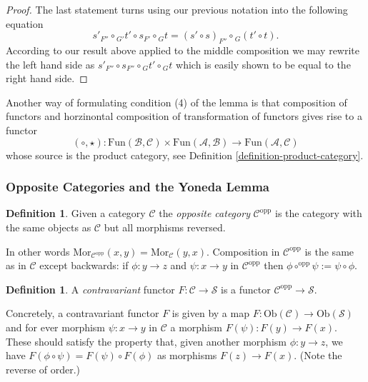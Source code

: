 \documentclass{amsart}
\theoremstyle{definition}
\newtheorem{definition}[theorem]{Definition}
\theoremstyle{remark}
\numberwithin{equation}{subsection}
\begin{document}
\begin{proof}
The last statement turns using our previous notation into the following
equation
$$
s'_{F''}
\circ
{}_{G'}t' 
\circ
s_{F'}
\circ
{}_Gt 
=
(s' \circ s)_{F''}
\circ
{}_G(t' \circ t).
$$
According to our result above applied to the middle composition
we may rewrite the left hand side as
$
s'_{F''}
\circ
s_{F''} 
\circ
{}_Gt'
\circ
{}_Gt 
$
which is easily shown to be equal to the right hand side.
\end{proof}

\noindent
Another way of formulating condition (4) of the lemma is
that composition of functors and horzinontal composition
of transformation of functors gives rise to a functor
$$
(\circ, \star) :
\text{Fun}(\mathcal{B}, \mathcal{C})
\times 
\text{Fun}(\mathcal{A}, \mathcal{B})
\longrightarrow
\text{Fun}(\mathcal{A}, \mathcal{C})
$$
whose source is the product category,
see Definition \ref{definition-product-category}.

\subsubsection{Opposite Categories and the Yoneda Lemma}
\label{subsubsection-opposite}

\begin{definition}
\label{definition-opposite}
Given a category $\mathcal{C}$ the {\it opposite category}
$\mathcal{C}^{\text{opp}}$ is the category with the same objects
as $\mathcal{C}$ but all morphisms reversed.
\end{definition}

\noindent
In other
words $\text{Mor}_{\mathcal{C}^{\text{opp}}}(x,y) =
\text{Mor}_{\mathcal{C}}(y,x)$. Composition in $\mathcal{C}^{\text{opp}}$
is the same as in $\mathcal{C}$ except backwards: if $\phi : y \to z$ and
$\psi : x \to y$ in $\mathcal{C}^{\text{opp}}$ then
$\phi \circ^{\text{opp}} \psi := \psi \circ \phi$.

\begin{definition}
A {\it contravariant} functor $F\colon
\mathcal{C}\to \mathcal{S}$ is a functor $\mathcal{C}^{\text{opp}}\to
\mathcal{S}$.
\end{definition}

\noindent
Concretely, a contravariant functor $F$ is given
by a map $F : \text{Ob}(\mathcal{C}) \to 
\text{Ob}(\mathcal{S})$ and for ever morphism
$\psi : x \to y$ in $\mathcal{C}$ a morphism
$F(\psi) : F(y) \to F(x)$. These should satisfy the property
that, given another morphism
$\phi : y \to z$, we have $F(\phi \circ \psi)
= F(\psi) \circ F(\phi)$ as morphisms $F(z) \to F(x)$.
(Note the reverse of order.)
\end{document}
